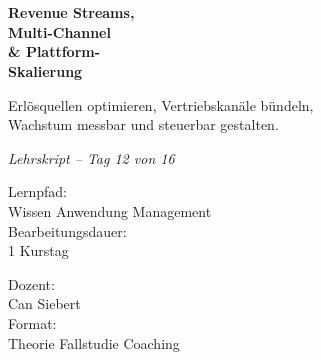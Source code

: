 \documentclass[11pt,a4paper,oneside]{article}
\newcommand{\caveatfontfallback}{\itshape}
\newcommand\caveatfont{\caveatfontfallback}%
\begin{document}
\begin{titlepage}
  \pagestyle{empty}
  \vspace*{1.5cm}
  \\[2pt]
  \noindent{\color{lpAccent}\rule{\linewidth}{1.2pt}}\\[4pt]

  \vspace{3cm}
  {\sffamily\fontsize{30}{34}\selectfont\bfseries\color{lpInk}Revenue Streams,\\Multi-Channel\\\& Plattform-\\Skalierung\par}

  \vspace{0.7cm}
  {\sffamily\large\color{lpGray}Erlösquellen optimieren, Vertriebskanäle bündeln,\\Wachstum messbar und steuerbar gestalten.\par}

  \vspace{1.5cm}
  {\caveatfont\LARGE\color{lpAmber}Lehrskript -- Tag 12 von 16}\par

  \vfill

  \noindent\begin{minipage}{0.55\linewidth}
    {\sffamily\footnotesize\color{lpGray}Lernpfad:}\\
    {\sffamily\small\color{lpInk}Wissen \textrightarrow{} Anwendung \textrightarrow{} Management}\\[10pt]
    {\sffamily\footnotesize\color{lpGray}Bearbeitungsdauer:}\\
    {\sffamily\small\color{lpInk}1 Kurstag}
  \end{minipage}\hfill
  \begin{minipage}{0.4\linewidth}
    \raggedleft
    {\sffamily\footnotesize\color{lpGray}Dozent:}\\
    {\sffamily\small\color{lpInk}Can Siebert}\\[10pt]
    {\sffamily\footnotesize\color{lpGray}Format:}\\
    {\sffamily\small\color{lpInk}Theorie \textperiodcentered{} Fallstudie \textperiodcentered{} Coaching}
  \end{minipage}

  \vspace{0.5cm}
  \noindent{\color{lpAccent}\rule{\linewidth}{0.6pt}}
\end{titlepage}
\end{document}
